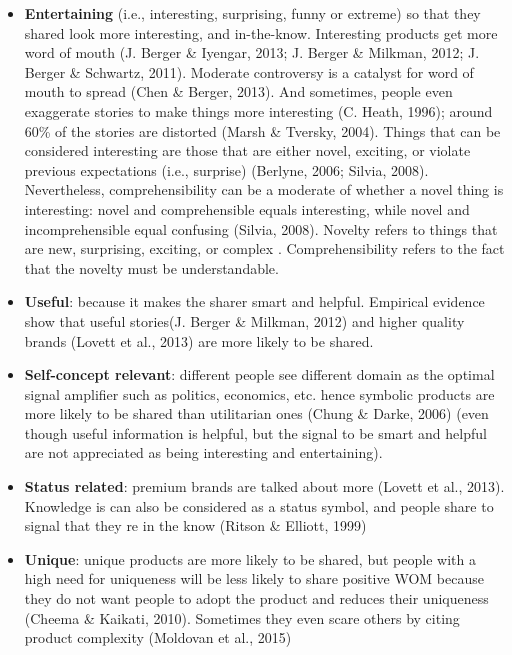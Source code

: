 \documentclass[
]{book}
\begin{document}
\begin{itemize}
\item
  \textbf{Entertaining} (i.e., interesting, surprising, funny or extreme) so that they shared look more interesting, and in-the-know. Interesting products get more word of mouth (J. Berger \& Iyengar, 2013; J. Berger \& Milkman, 2012; J. Berger \& Schwartz, 2011). Moderate controversy is a catalyst for word of mouth to spread (Chen \& Berger, 2013). And sometimes, people even exaggerate stories to make things more interesting (C. Heath, 1996); around 60\% of the stories are distorted (Marsh \& Tversky, 2004). Things that can be considered interesting are those that are either novel, exciting, or violate previous expectations (i.e., surprise) (Berlyne, 2006; Silvia, 2008). Nevertheless, comprehensibility can be a moderate of whether a novel thing is interesting: novel and comprehensible equals interesting, while novel and incomprehensible equal confusing (Silvia, 2008). Novelty refers to things that are new, surprising, exciting, or complex \citep{Berlyne}. Comprehensibility refers to the fact that the novelty must be understandable.
\item
  \textbf{Useful}: because it makes the sharer smart and helpful. Empirical evidence show that useful stories(J. Berger \& Milkman, 2012) and higher quality brands (Lovett et al., 2013) are more likely to be shared.\\
\item
  \textbf{Self-concept relevant}: different people see different domain as the optimal signal amplifier such as politics, economics, etc. hence symbolic products are more likely to be shared than utilitarian ones (Chung \& Darke, 2006) (even though useful information is helpful, but the signal to be smart and helpful are not appreciated as being interesting and entertaining).\\
\item
  \textbf{Status related}: premium brands are talked about more (Lovett et al., 2013). Knowledge is can also be considered as a status symbol, and people share to signal that they re in the know (Ritson \& Elliott, 1999)\\
\item
  \textbf{Unique}: unique products are more likely to be shared, but people with a high need for uniqueness will be less likely to share positive WOM because they do not want people to adopt the product and reduces their uniqueness (Cheema \& Kaikati, 2010). Sometimes they even scare others by citing product complexity (Moldovan et al., 2015)\\

\end{itemize}
\end{document}
